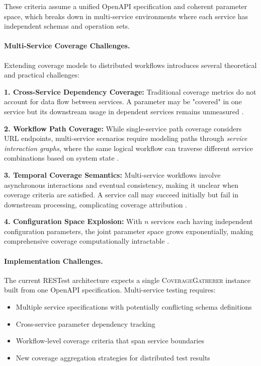 These criteria assume a unified OpenAPI specification and coherent parameter space, which breaks down in multi-service environments where each service has independent schemas and operation sets.

\paragraph{Multi-Service Coverage Challenges.}
Extending coverage models to distributed workflows introduces several theoretical and practical challenges:

\textbf{1. Cross-Service Dependency Coverage:} Traditional coverage metrics do not account for data flow between services. A parameter may be "covered" in one service but its downstream usage in dependent services remains unmeasured \cite{zhou2018microservice}.

\textbf{2. Workflow Path Coverage:} While single-service path coverage considers URL endpoints, multi-service scenarios require modeling paths through \emph{service interaction graphs}, where the same logical workflow can traverse different service combinations based on system state \cite{li2020testing}.

\textbf{3. Temporal Coverage Semantics:} Multi-service workflows involve asynchronous interactions and eventual consistency, making it unclear when coverage criteria are satisfied. A service call may succeed initially but fail in downstream processing, complicating coverage attribution \cite{fowler2014microservices}.

\textbf{4. Configuration Space Explosion:} With $n$ services each having independent configuration parameters, the joint parameter space grows exponentially, making comprehensive coverage computationally intractable \cite{arcuri2019restful}.

\paragraph{Implementation Challenges.}
The current RESTest architecture expects a single \textsc{CoverageGatherer} instance built from one OpenAPI specification. Multi-service testing requires:
\begin{itemize}[leftmargin=*]
    \item Multiple service specifications with potentially conflicting schema definitions
    \item Cross-service parameter dependency tracking
    \item Workflow-level coverage criteria that span service boundaries
    \item New coverage aggregation strategies for distributed test results
\end{itemize}

